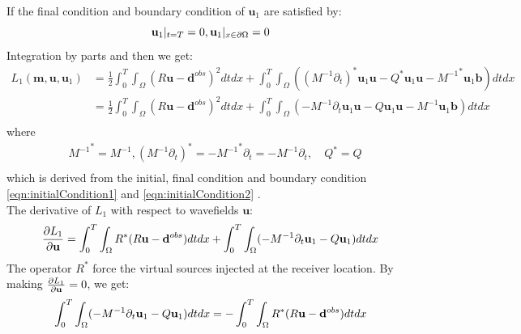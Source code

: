 \documentclass[pdftex,a4paper,parskip,listof=totoc,bibliography=totoc,onehalfspacing,12pt]{scrreprt}
\begin{document}
If the final condition and boundary condition of $\mathbf{u}_{1}$ are satisfied by:
\begin{equation}
\label{eqn:initialCondition2}
 \mathbf{u}_{1}|_{t=T} = 0, \mathbf{u}_{1}|_{x\in \partial \Omega} = 0\\
\end{equation}
Integration by parts and then we get:
\begin{equation}
\begin{split}
L_1(\mathbf{m}, \mathbf{u},\mathbf{u}_{1})
  & = \frac{1}{2} \int_0^T \int_\Omega (R\mathbf{u} - \mathbf{d}^{obs})^2 dt dx + \int_0^T \int_\Omega ((M^{-1} \partial_{t})^* \mathbf{u}_{1} \mathbf{u} - Q^* \mathbf{u}_{1} \mathbf{u} - {M^{-1}}^{*} \mathbf{u}_{1} \mathbf{b})  dt dx \\
  & = \frac{1}{2} \int_0^T \int_\Omega (R\mathbf{u} - \mathbf{d}^{obs})^2 dt dx + \int_0^T \int_\Omega (-M^{-1} \partial_{t} \mathbf{u}_{1} \mathbf{u} - Q \mathbf{u}_{1} \mathbf{u} - M^{-1} \mathbf{u}_{1} \mathbf{b})  dt dx\\
 \end{split}
\end{equation}
where 
\begin{equation}
\begin{split}
& {M^{-1}}^{*} =  M^{-1}, (M^{-1} \partial_{t}) ^{*} = -{M^{-1}}^{*} \partial_{t} = -M^{-1} \partial_{t}, \quad Q^{*} = Q\\
 \end{split}
\end{equation}
which is derived from the initial, final condition and boundary condition \ref{eqn:initialCondition1} and \ref{eqn:initialCondition2} \citep{yang2016review}.\\
The derivative of $L_1$ with respect to wavefields $\mathbf{u}$:
\begin{equation}
 \pdv{L_1}{\mathbf{u}} = \int_0^T \int_\Omega R^{*}(R\mathbf{u} - \mathbf{d}^{obs}) dt dx + \int_0^T \int_\Omega (-M^{-1} \partial_{t} \mathbf{u}_{1} - Q \mathbf{u}_{1})  dt dx\\
\end{equation}
The operator $R^{*}$ force the virtual sources injected at the receiver location. By making $\pdv{L_1}{\mathbf{u}} = 0$, we get:
\begin{equation}
 \int_0^T \int_\Omega (-M^{-1} \partial_{t} \mathbf{u}_{1}  - Q \mathbf{u}_{1})  dt dx = -\int_0^T \int_\Omega R^{*}(R\mathbf{u} - \mathbf{d}^{obs}) dt dx\\
\end{equation}
\end{document}
